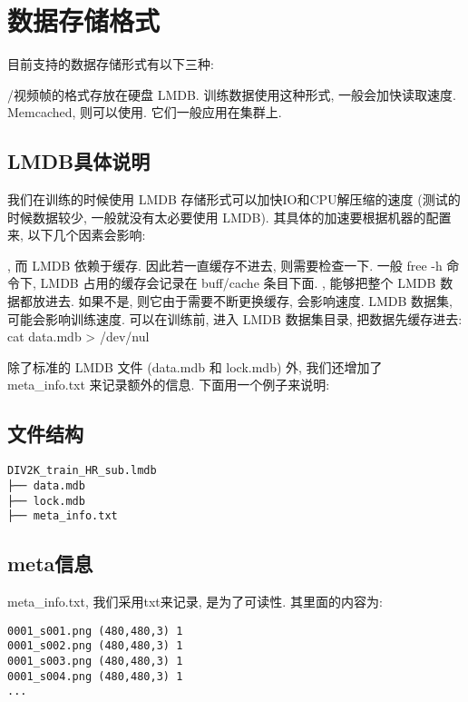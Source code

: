 \documentclass[../main.tex]{subfiles}
\begin{document}
\section{数据存储格式}


目前支持的数据存储形式有以下三种:
\begin{enumerate}
/视频帧的格式存放在硬盘
 LMDB. 训练数据使用这种形式, 一般会加快读取速度.
 Memcached, 则可以使用. 它们一般应用在集群上.
\end{enumerate}

\subsection{LMDB具体说明}
我们在训练的时候使用 LMDB 存储形式可以加快IO和CPU解压缩的速度 (测试的时候数据较少, 一般就没有太必要使用 LMDB). 其具体的加速要根据机器的配置来, 以下几个因素会影响:
\begin{enumerate}
, 而 LMDB 依赖于缓存. 因此若一直缓存不进去, 则需要检查一下. 一般 free -h 命令下, LMDB 占用的缓存会记录在 buff/cache 条目下面.
, 能够把整个 LMDB 数据都放进去. 如果不是, 则它由于需要不断更换缓存, 会影响速度.
 LMDB 数据集, 可能会影响训练速度. 可以在训练前, 进入 LMDB 数据集目录, 把数据先缓存进去: cat data.mdb > /dev/nul
\end{enumerate}
除了标准的 LMDB 文件 (data.mdb 和 lock.mdb) 外, 我们还增加了 
 meta\_info.txt 来记录额外的信息. 下面用一个例子来说明:

\subsection{文件结构}

\begin{verbatim}
DIV2K_train_HR_sub.lmdb
├── data.mdb
├── lock.mdb
├── meta_info.txt
\end{verbatim}


\subsection{meta信息}
meta\_info.txt, 我们采用txt来记录, 是为了可读性. 其里面的内容为:
\begin{verbatim}
0001_s001.png (480,480,3) 1
0001_s002.png (480,480,3) 1
0001_s003.png (480,480,3) 1
0001_s004.png (480,480,3) 1
...
\end{verbatim}
\end{document}
